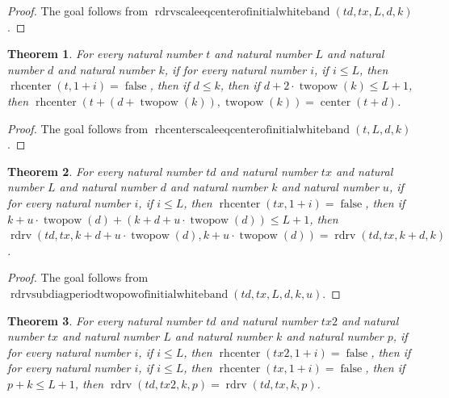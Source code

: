 \documentclass[11pt]{article}
\newtheorem{theorem}{Theorem}[section]
\theoremstyle{definition}
\begin{document}
\begin{proof}
The goal follows from \(\operatorname{rdrvscaleeqcenterofinitialwhiteband}(td, tx, L, d, k)\).
\end{proof}
\begin{theorem}
\label{ll:paper:rhcenter-scale-eq-center-of-initial-white-band}
For every natural number \(t\) and natural number \(L\) and natural number \(d\) and natural number \(k\), if for every natural number \(i\), if \(i \le L\), then \(\operatorname{rhcenter}(t, 1 + i) = \operatorname{false}\), then if \(d \le k\), then if \(d + 2 \cdot \operatorname{twopow}(k) \le L + 1\), then \(\operatorname{rhcenter}(t + (d + \operatorname{twopow}(k)), \operatorname{twopow}(k)) = \operatorname{center}(t + d)\).
\end{theorem}
\begin{proof}
The goal follows from \(\operatorname{rhcenterscaleeqcenterofinitialwhiteband}(t, L, d, k)\).
\end{proof}
\begin{theorem}
\label{ll:paper:rdrv-subdiag-period-twopow-of-initial-white-band}
For every natural number \(td\) and natural number \(tx\) and natural number \(L\) and natural number \(d\) and natural number \(k\) and natural number \(u\), if for every natural number \(i\), if \(i \le L\), then \(\operatorname{rhcenter}(tx, 1 + i) = \operatorname{false}\), then if \(k + u \cdot \operatorname{twopow}(d) + (k + d + u \cdot \operatorname{twopow}(d)) \le L + 1\), then \(\operatorname{rdrv}(td, tx, k + d + u \cdot \operatorname{twopow}(d), k + u \cdot \operatorname{twopow}(d)) = \operatorname{rdrv}(td, tx, k + d, k)\).
\end{theorem}
\begin{proof}
The goal follows from \(\operatorname{rdrvsubdiagperiodtwopowofinitialwhiteband}(td, tx, L, d, k, u)\).
\end{proof}
\begin{theorem}
\label{ll:paper:rdrv-eq-of-both-initial-white-band}
For every natural number \(td\) and natural number \(tx2\) and natural number \(tx\) and natural number \(L\) and natural number \(k\) and natural number \(p\), if for every natural number \(i\), if \(i \le L\), then \(\operatorname{rhcenter}(tx2, 1 + i) = \operatorname{false}\), then if for every natural number \(i\), if \(i \le L\), then \(\operatorname{rhcenter}(tx, 1 + i) = \operatorname{false}\), then if \(p + k \le L + 1\), then \(\operatorname{rdrv}(td, tx2, k, p) = \operatorname{rdrv}(td, tx, k, p)\).
\end{theorem}
\end{document}
